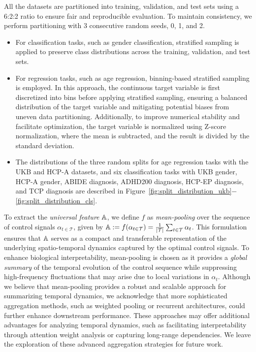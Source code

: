 All the datasets are partitioned into training, validation, and test sets using a 6:2:2 ratio to ensure fair and reproducible evaluation. To maintain consistency, we perform partitioning with 3 consecutive random seeds, 0, 1, and 2.
\begin{itemize}[leftmargin=10pt]
\item For classification tasks, such as gender classification, stratified sampling is applied to preserve class distributions across the training, validation, and test sets. 
\item For regression tasks, such as age regression, binning-based stratified sampling is employed. In this approach, the continuous target variable is first discretized into bins before applying stratified sampling, ensuring a balanced distribution of the target variable and mitigating potential biases from uneven data partitioning. Additionally, to improve numerical stability and facilitate optimization, the target variable is normalized using Z-score normalization, where the mean is subtracted, and the result is divided by the standard deviation.
\item The distributions of the three random splits for age regression tasks with the UKB and HCP-A datasets, and six classification tasks with UKB gender, HCP-A gender, ABIDE diagnosis, ADHD200 diagnosis, HCP-EP diagnosis, and TCP diagnosis are described in Figure~\ref{fig:split_distribution_ukb}$-$\ref{fig:split_distribution_cls}.
\end{itemize}

 To extract the \textit{universal feature} $\mathbb{A}$, we define $f$ as \textit{mean-pooling} over the sequence of control signals $\alpha_{t \in \mathcal{T}}$, given by $\mathbb{A} := f(\alpha_{t \in \mathcal{T}}) = \frac{1}{|\mathcal{T}|} \sum_{t \in \mathcal{T}} \alpha_t$. This formulation ensures that $\mathbb{A}$ serves as a compact and transferable representation of the underlying spatio-temporal dynamics captured by the optimal control signals. To enhance biological interpretability, mean-pooling is chosen as it provides a \textit{global summary} of the temporal evolution of the control sequence while suppressing high-frequency fluctuations that may arise due to local variations in $\alpha_t$. Although we believe that mean-pooling provides a robust and scalable approach for summarizing temporal dynamics, we acknowledge that more sophisticated aggregation methods, such as weighted pooling or recurrent architectures, could further enhance downstream performance. These approaches may offer additional advantages for analyzing temporal dynamics, such as facilitating interpretability through attention weight analysis or capturing long-range dependencies. We leave the exploration of these advanced aggregation strategies for future work.


